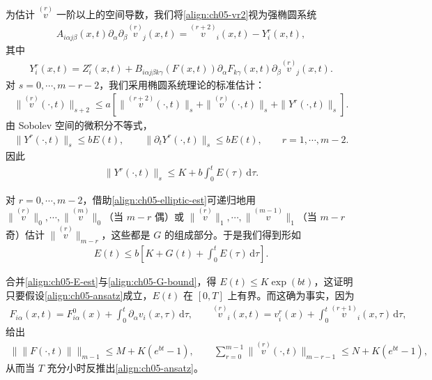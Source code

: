 \documentclass[../../main.tex]{subfiles}
\begin{document}
为估计 $\overset{(r)}{v}$ 一阶以上的空间导数，我们将\eqref{align:ch05-vr2}视为强椭圆系统
\begin{align}
A_{i\alpha j\beta}(x,t)\partial_{\alpha}\partial_{\beta}\overset{(r)}{v}_{j}(x,t)=\overset{(r+2)}{v}_{i}(x,t)-Y_{i}^{r}(x,t),\label{align:ch05-elliptic}
\end{align}
其中
\begin{align}
Y_{i}^{r}(x,t)=Z_{i}^{r}(x,t)+B_{i\alpha j\beta k\gamma}(F(x,t))\partial_{\alpha}F_{k\gamma}(x,t)\partial_{\beta}\overset{(r)}{v}_{j}(x,t).\label{align:ch05-Yr-def}
\end{align}
对 $s=0,\cdots,m-r-2$，我们采用椭圆系统理论的标准估计：
\begin{align}
\|\overset{(r)}{v}(\cdot,t)\|_{s+2}\leqslant a\left[\|\overset{(r+2)}{v}(\cdot,t)\|_{s}+\|\overset{(r)}{v}(\cdot,t)\|_{s}+\|Y^{r}(\cdot,t)\|_{s}\right].\label{align:ch05-elliptic-est}
\end{align}
由 Sobolev 空间的微积分不等式，
\begin{align}
\|Y^{r}(\cdot,t)\|_{s}\leqslant bE(t),\qquad\|\partial_{t}Y^{r}(\cdot,t)\|_{s}\leqslant bE(t),\qquad r=1,\cdots,m-2.\label{align:ch05-Yr-bound}
\end{align}
因此
\begin{align}
\|Y^{r}(\cdot,t)\|_{s}\leqslant K+b\int_{0}^{t}E(\tau)\,\mathrm{d}\tau.\label{align:ch05-Yr-Gronwall}
\end{align}

对 $r=0,\cdots,m-2$，借助\eqref{align:ch05-elliptic-est}可递归地用 $\|\overset{(r)}{v}\|_{0},\cdots,\|\overset{(m)}{v}\|_{0}$（当 $m-r$ 偶）或 $\|\overset{(r)}{v}\|_{1},\cdots,\|\overset{(m-1)}{v}\|_{1}$（当 $m-r$ 奇）估计 $\|\overset{(r)}{v}\|_{m-r}$，这些都是 $G$ 的组成部分。于是我们得到形如
\begin{align}
E(t)\leqslant b\left[K+G(t)+\int_{0}^{t}E(\tau)\,\mathrm{d}\tau\right].\label{align:ch05-E-est}
\end{align}

合并\eqref{align:ch05-E-est}与\eqref{align:ch05-G-bound}，得 $E(t)\leqslant K\exp(bt)$，这证明只要假设\eqref{align:ch05-ansatz}成立，$E(t)$ 在 $[0,T]$ 上有界。而这确为事实，因为
\begin{align}
F_{i\alpha}(x,t)=F_{i\alpha}^{0}(x)+\int_{0}^{t}\partial_{\alpha}v_{i}(x,\tau)\,\mathrm{d}\tau,\qquad\overset{(r)}{v}_{i}(x,t)=v_{i}^{r}(x)+\int_{0}^{t}\overset{(r+1)}{v}_{i}(x,\tau)\,\mathrm{d}\tau,\label{align:ch05-integral-rel}
\end{align}
给出
\begin{align}
\|\|F(\cdot,t)\|\|_{m-1}\leqslant M+K(e^{bt}-1),\qquad\sum_{r=0}^{m-1}\|\overset{(r)}{v}(\cdot,t)\|_{m-r-1}\leqslant N+K(e^{bt}-1),\label{align:ch05-a-posteriori}
\end{align}
从而当 $T$ 充分小时反推出\eqref{align:ch05-ansatz}。
\end{document}
